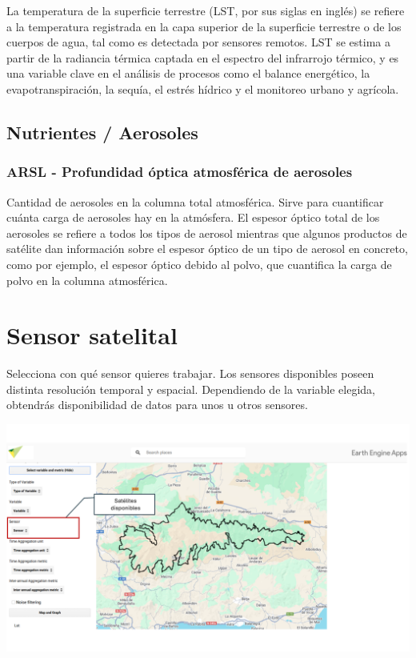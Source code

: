 \documentclass[
]{book}
\begin{document}
La temperatura de la superficie terrestre (LST, por sus siglas en inglés) se refiere a la temperatura registrada en la capa superior de la superficie terrestre o de los cuerpos de agua, tal como es detectada por sensores remotos. LST se estima a partir de la radiancia térmica captada en el espectro del infrarrojo térmico, y es una variable clave en el análisis de procesos como el balance energético, la evapotranspiración, la sequía, el estrés hídrico y el monitoreo urbano y agrícola.

\section{\texorpdfstring{\textbf{Nutrientes / Aerosoles}}{Nutrientes / Aerosoles}}\label{nutrientes-aerosoles}

\subsection{\texorpdfstring{\textbf{ARSL} - Profundidad óptica atmosférica de aerosoles}{ARSL - Profundidad óptica atmosférica de aerosoles}}\label{arsl---profundidad-uxf3ptica-atmosfuxe9rica-de-aerosoles}

Cantidad de aerosoles en la columna total atmosférica. Sirve para cuantificar cuánta carga de aerosoles hay en la atmósfera. El espesor óptico total de los aerosoles se refiere a todos los tipos de aerosol mientras que algunos productos de satélite dan información sobre el espesor óptico de un tipo de aerosol en concreto, como por ejemplo, el espesor óptico debido al polvo, que cuantifica la carga de polvo en la columna atmosférica.

\chapter{Sensor satelital}\label{sensor}

Selecciona con qué sensor quieres trabajar. Los sensores disponibles poseen distinta resolución temporal y espacial. Dependiendo de la variable elegida, obtendrás disponibilidad de datos para unos u otros sensores.

\includegraphics{assets/sensor_es.png}
\end{document}
